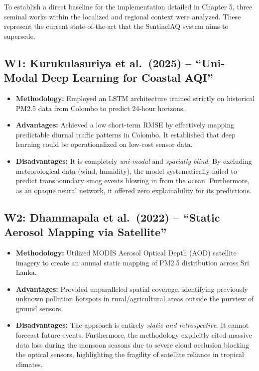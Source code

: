 To establish a direct baseline for the implementation detailed in
Chapter 5, three seminal works within the localized and regional context
were analyzed. These represent the current state-of-the-art that the
SentinelAQ system aims to supersede.

\subsection{W1: Kurukulasuriya et al.~(2025) -- ``Uni-Modal Deep
Learning for Coastal
AQI''}\label{w1-kurukulasuriya-et-al.-2025-uni-modal-deep-learning-for-coastal-aqi}

\begin{itemize}
\tightlist
\item
  \textbf{Methodology:} Employed an LSTM architecture trained strictly
  on historical PM2.5 data from Colombo to predict 24-hour horizons.
\item
  \textbf{Advantages:} Achieved a low short-term RMSE by effectively
  mapping predictable diurnal traffic patterns in Colombo. It
  established that deep learning could be operationalized on low-cost
  sensor data.
\item
  \textbf{Disadvantages:} It is completely \emph{uni-modal} and
  \emph{spatially blind}. By excluding meteorological data (wind,
  humidity), the model systematically failed to predict transboundary
  smog events blowing in from the ocean. Furthermore, as an opaque
  neural network, it offered zero explainability for its predictions.
\end{itemize}

\subsection{W2: Dhammapala et al.~(2022) -- ``Static Aerosol Mapping via
Satellite''}\label{w2-dhammapala-et-al.-2022-static-aerosol-mapping-via-satellite}

\begin{itemize}
\tightlist
\item
  \textbf{Methodology:} Utilized MODIS Aerosol Optical Depth (AOD)
  satellite imagery to create an annual static mapping of PM2.5
  distribution across Sri Lanka.
\item
  \textbf{Advantages:} Provided unparalleled spatial coverage,
  identifying previously unknown pollution hotspots in
  rural/agricultural areas outside the purview of ground sensors.
\item
  \textbf{Disadvantages:} The approach is entirely \emph{static and
  retrospective}. It cannot forecast future events. Furthermore, the
  methodology explicitly cited massive data loss during the monsoon
  seasons due to severe cloud occlusion blocking the optical sensors,
  highlighting the fragility of satellite reliance in tropical climates.
\end{itemize}

